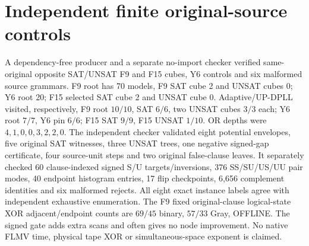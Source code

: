 \documentclass[11pt]{article}
\begin{document}
\section{Independent finite original-source controls}
A dependency-free producer and a separate no-import checker verified same-original opposite SAT/UNSAT F9 and F15 cubes, Y6 controls and six malformed source grammars. F9 root has 70 models, F9 SAT cube 2 and UNSAT cubes 0; Y6 root 20; F15 selected SAT cube 2 and UNSAT cube 0. Adaptive/UP-DPLL visited, respectively, F9 root $10/10$, SAT $6/6$, two UNSAT cubes $3/3$ each; Y6 root $7/7$, Y6 pin $6/6$; F15 SAT $9/9$, F15 UNSAT $1/10$. OR depths were $4,1,0,0,3,2,2,0$. The independent checker validated eight potential envelopes, five original SAT witnesses, three UNSAT trees, one negative signed-gap certificate, four source-unit steps and two original false-clause leaves. It separately checked 60 clause-indexed signed S/U targets/inversions, 376 SS/SU/US/UU pair modes, 40 endpoint histogram entries, 17 flip checkpoints, 6,656 complement identities and six malformed rejects. All eight exact instance labels agree with independent exhaustive enumeration. The F9 fixed original-clause logical-state XOR adjacent/endpoint counts are $69/45$ binary, $57/33$ Gray, OFFLINE. The signed gate adds extra scans and often gives no node improvement. No native FLMV time, physical tape XOR or simultaneous-space exponent is claimed.
\end{document}
